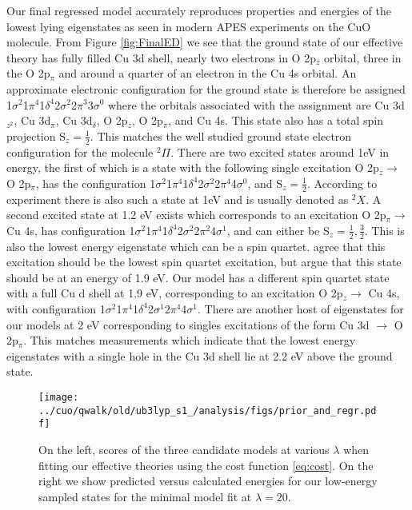 \documentclass[12pt]{article}
\begin{document}
Our final regressed model accurately reproduces properties and energies of the lowest lying eigenstates as seen in modern APES experiments on the CuO molecule.
From Figure \ref{fig:FinalED} we see that the ground state of our effective theory has fully filled Cu 3d shell, nearly two electrons in O 2p$_z$ orbital, three in the O 2p$_\pi$ and around a quarter of an electron in the Cu 4s orbital.
An approximate electronic configuration for the ground state is therefore
be assigned 1$\sigma^2$1$\pi^4$1$\delta^4$2$\sigma^2$2$\pi^3$3$\sigma^0$ where the orbitals associated with the assignment are Cu 3d$_{z^2}$, Cu 3d$_\pi$, Cu 3d$_\delta$, O 2p$_z$, O 2p$_\pi$, and Cu 4s.
This state also has a total spin projection S$_z = \frac{1}{2}$.
This matches the well studied ground state electron configuration for the molecule $^2\Pi$.
There are two excited states around 1eV in energy, the first of which is a state with the following single excitation O 2p$_z \rightarrow$ O 2p$_\pi$, has the configuration 1$\sigma^2$1$\pi^4$1$\delta^4$2$\sigma^2$2$\pi^4$4$\sigma^0$, and S$_z = \frac{1}{2}$.
According to experiment there is also such a state at 1eV and is usually denoted as $^2X$.
A second excited state at 1.2 eV exists which corresponds to an excitation 
O 2p$_\pi \rightarrow$ Cu 4s, has configuration 1$\sigma^2$1$\pi^4$1$\delta^4$2$\sigma^2$2$\pi^2$4$\sigma^1$, and can either be S$_z = \frac{1}{2}, \frac{3}{2}$. 
This is also the lowest energy eigenstate which can be a spin quartet.
 agree that this excitation should be the lowest spin quartet excitation, but argue that this state should be at an energy of 1.9 eV. 
Our model has a different spin quartet state with a full Cu d shell at 1.9 eV, corresponding to an excitation O 2p$_z \rightarrow$ Cu 4s, with configuration 1$\sigma^2$1$\pi^4$1$\delta^4$2$\sigma^1$2$\pi^4$4$\sigma^1$. 
There are another host of eigenstates for our models at 2 eV corresponding to singles excitations of the form Cu 3d $\rightarrow$ O 2p$_\pi$. 
This matches measurements which indicate that the lowest energy eigenstates with a single hole in the Cu 3d shell lie at 2.2 eV above the ground state.


\begin{figure}[H]
\begin{center}
\texttt{[image: ../cuo/qwalk/old/ub3lyp\_s1\_/analysis/figs/prior\_and\_regr.pdf]}
\end{center}
\caption{On the left, scores of the three candidate models at various $\lambda$ when fitting our effective theories using the cost function \eqref{eq:cost}. On the right we show predicted versus calculated energies for our low-energy sampled states for the minimal model fit at $\lambda = 20$.}
\label{fig:Prior}
\end{figure}
\end{document}
